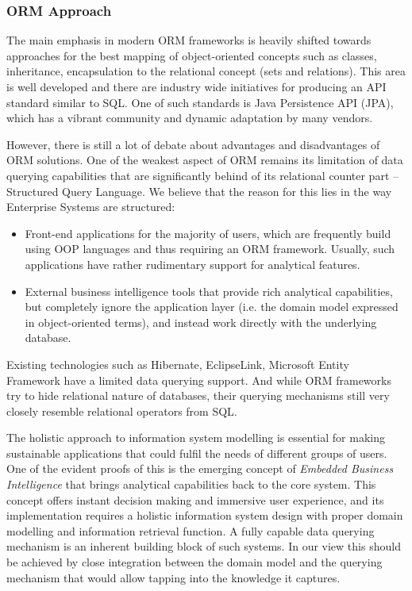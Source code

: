   \subsubsection{ORM Approach}
  The main emphasis in modern ORM frameworks is heavily shifted towards approaches for the best mapping of object-oriented concepts such as classes, inheritance, encapsulation to the relational concept (sets and relations).
  This area is well developed and there are industry wide initiatives for producing an API standard similar to SQL.
  One of such standards is Java Persistence API (JPA), which has a vibrant community and dynamic adaptation by many vendors.
  
  However, there is still a lot of debate about advantages and disadvantages of ORM solutions.
  One of the weakest aspect of ORM remains its limitation of data querying capabilities that are significantly behind of its relational counter part -- Structured Query Language.
  We believe that the reason for this lies in the way Enterprise Systems are structured:
  \begin{itemize}
   \item Front-end applications for the majority of users, which are frequently build using OOP languages and thus requiring an ORM framework. 
   Usually, such applications have rather rudimentary support for analytical features.
   \item External business intelligence tools that provide rich analytical capabilities, but completely ignore the application layer (i.e. the domain model expressed in object-oriented terms), and instead work directly with the underlying database.
  \end{itemize}
  Existing technologies such as Hibernate, EclipseLink, Microsoft Entity Framework have a limited data querying support.
  And while ORM frameworks try to hide relational nature of databases, their querying mechanisms still very closely resemble relational operators from SQL.  
  
  The holistic approach to information system modelling is essential for making sustainable applications that could fulfil the needs of different groups of users.
  One of the evident proofs of this is the emerging concept of \emph{Embedded Business Intelligence} that brings analytical capabilities back to the core system.
  This concept offers instant decision making and immersive user experience, and its implementation requires a holistic information system design with proper domain modelling and information retrieval function.
  A fully capable data querying mechanism is an inherent building block of such systems.
  In our view this should be achieved by close integration between the domain model and the querying mechanism that would allow tapping into the knowledge it captures.
  
